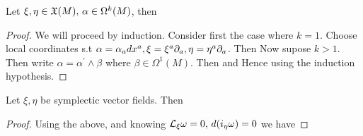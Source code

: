 \documentclass{article}
\begin{document}
\begin{lemma}
Let $\xi,\eta \in \mathfrak{X}(M), \, \alpha \in \Omega^k(M)$, then 
\end{lemma}
\begin{proof}
We will proceed by induction. Consider first the case where $k=1$. Choose local coordinates s.t $\alpha = \alpha_a dx^a, \xi=\xi^a \partial_a, \eta = \eta^a \partial_a$. Then 
Now supose $k >1$. Then write $\alpha = \alpha^\prime \wedge \beta$ where $\beta \in \Omega^1(M)$. Then 
and 
Hence 
using the induction hypothesis.
\end{proof}

\begin{prop}
Let $\xi,\eta$ be symplectic vector fields. Then 
\end{prop}
\begin{proof}
Using the above, and knowing $\mathcal{L}_\xi \omega = 0, \, d(i_\eta \omega) = 0$ we have 
\end{proof}
\end{document}
